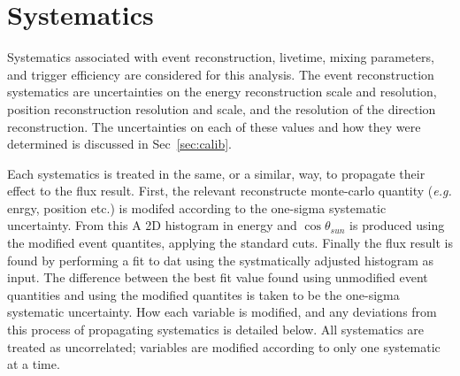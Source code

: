 \section{Systematics}
\label{sec:systematics}
Systematics associated with event reconstruction, livetime, mixing parameters,
and trigger efficiency are considered for this analysis.
The event reconstruction systematics are uncertainties on the energy reconstruction
scale and resolution, position reconstruction resolution and scale, and the
resolution of the direction reconstruction.
The uncertainties on each of these values and how they were determined is
discussed in Sec~\ref{sec:calib}.

Each systematics is treated in the same, or a similar, way, to propagate
their effect to the flux result.
First, the relevant reconstructe monte-carlo quantity (\textit{e.g.} enrgy, position etc.)
is modifed according to the one-sigma systematic uncertainty.
From this A 2D histogram in energy and $\cos\theta_{sun}$ is produced using the
modified event quantites, applying the standard cuts.
Finally the flux result is found by performing a fit to dat using the systmatically
adjusted histogram as input.
The difference between the best fit value found using unmodified event quantities
and using the modified quantites is taken to be the one-sigma systematic uncertainty.
How each variable is modified, and any deviations from this process of
propagating systematics is detailed below.
All systematics are treated as uncorrelated; variables are modified according to
only one systematic at a time.

